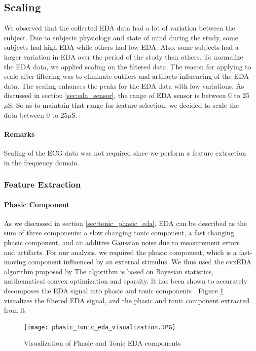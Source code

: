 \subsection{Scaling}
\label{sec:eda_scaling}
We observed that the collected EDA data had a lot of variation between the subject. Due to subjects physiology and state of mind during the study, some subjects had high EDA while others had low EDA. Also, some subjects had a larger variation in EDA over the period of the study than others. To normalize the EDA data, we applied scaling on the filtered data. The reason for applying to scale after filtering was to eliminate outliers and artifacts influencing of the EDA data. The scaling enhances the peaks for the EDA data with low variations. As discussed in section \ref{sec:eda_sensor}, the range of EDA sensor is between 0 to 25$\mu$S. So as to maintain that range for feature selection, we decided to scale the data between 0 to 25$\mu$S.

\paragraph{Remarks} Scaling of the ECG data was not required since we perform a feature extraction in the frequency domain.

\subsubsection{Feature Extraction}
\label{sec:eda_fet_ext}
\paragraph{Phasic Component} As we discussed in section \ref{sec:tonic_phasic_eda}, EDA can be described as the sum of three components: a slow changing tonic component, a fast changing phasic component, and an additive Gaussian noise due to measurement errors and artifacts. For our analysis, we required the phasic component, which is a fast-moving component influenced by an external stimulus. We thus used the cvxEDA algorithm proposed by \citeauthor{greco_cvxeda:_2016}\cite{greco_cvxeda:_2016} The algorithm is based on Bayesian statistics, mathematical convex optimization and sparsity. It has been shown to accurately decomposes the EDA signal into phasic and tonic components \cite{greco_cvxeda:_2016}. Figure \ref{fig:phasic_tonic_visualization} visualizes the filtered EDA signal, and the phasic and tonic component extracted from it. 

\begin{figure}
    \centering
    \texttt{[image: phasic\_tonic\_eda\_visualization.JPG]}
    \caption{Visualization of Phasic and Tonic EDA components}
    \label{fig:phasic_tonic_visualization}
\end{figure}


